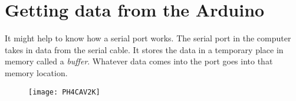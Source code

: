 %
%
%
%

\section{Getting data from the Arduino}

It might help to know how a serial port works. The serial port in the
computer takes in data from the serial cable. It stores the data in a
temporary place in memory called a \emph{buffer}. Whatever data comes into
the port goes into that memory location. \begin{figure}[h!]
\texttt{[image: PH4CAV2K]}
\end{figure}

